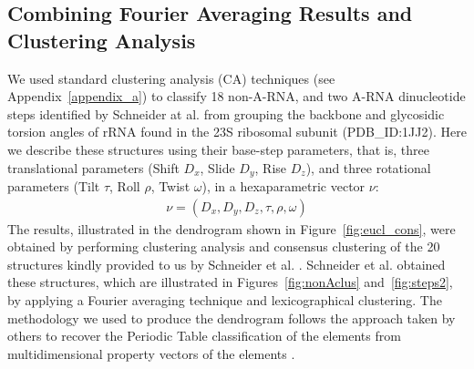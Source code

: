 \subsection{Combining Fourier Averaging Results and Clustering Analysis}
We   used   standard   clustering   analysis  (CA)   techniques   (see
Appendix~\ref{appendix_a})  to classify  18 non-A-RNA,  and  two A-RNA
dinucleotide steps identified  by Schneider at al.\cite{schneider2004}
from grouping the backbone and glycosidic torsion angles of rRNA found
in the  23S ribosomal subunit (PDB\_ID:1JJ2).  Here  we describe these
structures   using  their   base-step  parameters,   that   is,  three
translational parameters  (Shift $D_x$, Slide $D_y$,  Rise $D_z$), and
three   rotational  parameters  (Tilt   $\tau$,  Roll   $\rho$,  Twist
$\omega$), in a hexaparametric vector $\nu$:
\begin{gather}
\nu = (D_x, D_y, D_z, \tau, \rho, \omega)
\end{gather}
The    results,    illustrated   in    the    dendrogram   shown    in
Figure~\ref{fig:eucl_cons},  were  obtained  by performing  clustering
analysis and consensus clustering of the 20 structures kindly provided
to  us by Schneider  et al.   \cite{schneider2004}.  Schneider  et al.
obtained    these    structures,     which    are    illustrated    in
Figures~\ref{fig:nonAclus} and~\ref{fig:steps2}, by applying a Fourier
averaging technique  and lexicographical clustering.   The methodology
we used to produce the dendrogram follows the approach taken by others
to  recover the  Periodic Table  classification of  the  elements from
multidimensional property vectors  of the elements \cite{restrepo2004,
  restrepo2006}.
